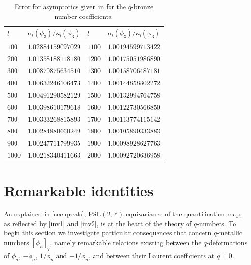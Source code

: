 \documentclass[11pt,reqno]{amsart}
\theoremstyle{plain}
\theoremstyle{definition}
\numberwithin{figure}{section}
\numberwithin{table}{section}
\numberwithin{equation}{section}
\newcommand{\Z}{\mathbb{Z}}
\newcommand{\PSL}{\mathrm{PSL}}
\newcommand\al{\alpha}
\newcommand\ka{\kappa}
\begin{document}
\begin{table}[ht!]
\caption{\small Error for asymptotics given in  for the $q$-bronze number coefficients.}
\begin{tabular}{|l|l||l|l|} \hline
$l$ & $\al_l(\phi_3)/\ka_l(\phi_3)$ & $l$ & $\al_l(\phi_3)/\ka_l(\phi_3)$ \\ \hline
$100$ & $1.02884159097029$ & $1100$ & $1.00194599713422$ \\ \hline
$200$ & $1.01358188118180$ & $1200$ & $1.00175051986890$ \\ \hline
$300$ & $1.00870875634510$ & $1300$ & $1.00158706487181$ \\ \hline
$400$ & $1.00632246106473$ & $1400$ & $1.00144858802272$ \\ \hline
$500$ & $1.00491290582129$ & $1500$ & $1.00132994764758$ \\ \hline
$600$ & $1.00398610179618$ & $1600$ & $1.00122730566850$ \\ \hline
$700$ & $1.00333268815893$ & $1700$ & $1.00113774115142$ \\ \hline
$800$ & $1.00284880660249$ & $1800$ & $1.00105899333883$ \\ \hline
$900$ & $1.00247711799935$ & $1900$ & $1.00098928627763$ \\ \hline
$1000$ & $1.00218340411663$ & $2000$ & $1.00092720636958$ \\ \hline
\end{tabular}
\end{table}

















\section{Remarkable identities}\label{sec-identities}


As explained in \cref{sec-qreals},  $\PSL(2,\Z)$-equivariance  of the quantification map, as reflected by \eqref{inv1} and \eqref{inv2}, is at the heart of the theory of $q$-numbers. To begin this section we investigate particular consequences that concern $q$-metallic numbers $[\phi_n]_q$, namely remarkable relations existing between the $q$-deformations of $\phi_n$, $-\phi_n$, $1/\phi_n$ and $-1/\phi_n$, and between their Laurent coefficients at $q=0$. 
\end{document}
